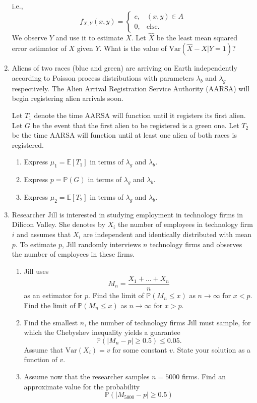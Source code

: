 \documentclass[a4paper,9pt,landscape]{extarticle}
\newcommand{\var}{\textrm{Var}}
\begin{document}
\begin{multicols*}{3}
\begin{enumerate}
	i.e., $$f_{X,Y}(x,y)=\begin{cases}
		c,&(x,y)\in A\\
		0,&\text{else.}
	\end{cases}$$
	We observe $Y$ and use it to estimate $X$. Let $\widehat{X}$ be the least mean squared error estimator of $X$ given $Y$. What is the value of $\var\left(\widehat{X}-X|Y=1\right)$?
	\item Aliens of two races (blue and green) are arriving on Earth independently according to Poisson process distributions with parameters $\lambda_b$ and $\lambda_g$ respectively. The Alien Arrival Registration Service Authority (AARSA) will begin registering alien arrivals soon.

	Let $T_1$ denote the time AARSA will function until it registers its first alien. Let $G$ be the event that the first alien to be registered is a green one. Let $T_2$ be the time AARSA will function until at least one alien of both races is registered.
	\begin{enumerate}
		\item Express $\mu_1=\mathds{E}[T_1]$ in terms of $\lambda_g$ and $\lambda_b$.
		\item Express $p=\mathds{P}(G)$ in terms of $\lambda_g$ and $\lambda_b$.
		\item Express $\mu_2=\mathds{E}[T_2]$ in terms of $\lambda_g$ and $\lambda_b$.
	\end{enumerate}
	\item Researcher Jill is interested in studying employment in technology firms in Dilicon Valley. She denotes by $X_i$ the number of employees in technology firm $i$ and assumes that $X_i$ are independent and identically distributed with mean $p$. To estimate $p$, Jill randomly interviews $n$ technology firms and observes the number of employees in these firms.
	\begin{enumerate}
		\item Jill uses $$M_n=\frac{X_1+\dots+X_n}{n}$$ as an estimator for $p$. Find the limit of $\mathds{P}(M_n\leq x)$ as $n\rightarrow\infty$ for $x<p$. Find the limit of $\mathds{P}(M_n\leq x)$ as $n\rightarrow\infty$ for $x>p$.
		\item Find the smallest $n$, the number of technology firms Jill must sample, for which the Chebyshev inequality yields a guarantee $$\mathds{P}\left(\left|M_n-p\right|\geq0.5\right)\leq0.05.$$ Assume that $\var(X_i)=v$ for some constant $v$. State your solution as a function of $v$.
		\item Assume now that the researcher samples $n=5000$ firms. Find an approximate value for the probability $$\mathds{P}\left(\left|M_{5000}-p\right|\geq0.5\right)$$

\end{enumerate}
\end{enumerate}
\end{multicols*}
\end{document}
